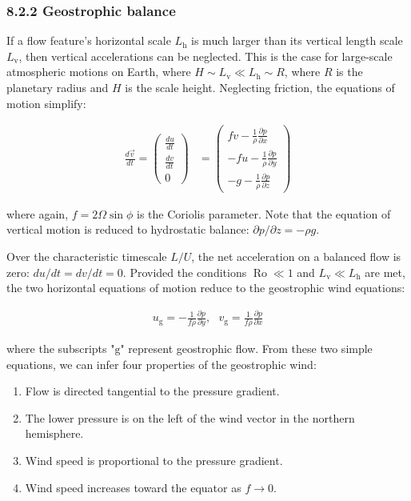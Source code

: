 \documentclass[11pt]{article}
\providecommand{\tightlist}{%
      \setlength{\itemsep}{0pt}\setlength{\parskip}{0pt}}
\begin{document}
    \subsubsection{8.2.2 Geostrophic balance}\label{geostrophic-balance}

If a flow feature's horizontal scale \(L_\mathrm{h}\) is much larger
than its vertical length scale \(L_\mathrm{v}\), then vertical
accelerations can be neglected. This is the case for large-scale
atmospheric motions on Earth, where
\(H \sim L_\mathrm{v} \ll L_\mathrm{h} \sim R\), where \(R\) is the
planetary radius and \(H\) is the scale height. Neglecting friction, the
equations of motion simplify:

\begin{align}
    \frac{d\vec{v}}{dt} = \begin{pmatrix} \frac{du}{dt} \\ \frac{dv}{dt} \\ 0 \end{pmatrix} &= \begin{pmatrix} fv - \frac{1}{\rho}\frac{\partial p}{\partial x} \\ -fu - \frac{1}{\rho}\frac{\partial p}{\partial y} \\ -g - \frac{1}{\rho}\frac{\partial p}{\partial z} \end{pmatrix}
\end{align}

where again, \(f = 2\Omega\sin\phi\) is the Coriolis parameter. Note
that the equation of vertical motion is reduced to hydrostatic balance:
\(\partial p/\partial z = -\rho g\).

Over the characteristic timescale \(L/U\), the net acceleration on a
balanced flow is zero: \(du/dt = dv/dt = 0\). Provided the conditions
\(\operatorname{Ro} \ll 1\) and \(L_\mathrm{v} \ll L_\mathrm{h}\) are
met, the two horizontal equations of motion reduce to the geostrophic
wind equations:

\begin{align}
    u_\mathrm{g} = -\frac{1}{f\rho}\frac{\partial p}{\partial y}, ~~~ v_\mathrm{g} = \frac{1}{f\rho}\frac{\partial p}{\partial x}
\end{align}

where the subscripts "\(\mathrm{g}\)" represent geostrophic flow. From
these two simple equations, we can infer four properties of the
geostrophic wind:

\begin{enumerate}
\def\labelenumi{\arabic{enumi}.}
\tightlist
\item
  Flow is directed tangential to the pressure gradient.
\item
  The lower pressure is on the left of the wind vector in the northern
  hemisphere.
\item
  Wind speed is proportional to the pressure gradient.
\item
  Wind speed increases toward the equator as \(f \rightarrow 0\).
\end{enumerate}
\end{document}
